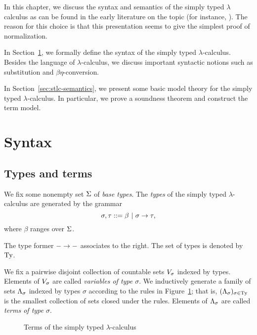 In this chapter, we discuss the syntax and semantics of the simply typed $\lambda$ calculus as can be found in the early literature on the topic (for instance, \cite{friedman1975equality, plotkin:1980}). The reason for this choice is that this presentation seems to give the simplest proof of normalization.

In Section~\ref{sec:stlc-syntax}, we formally define the syntax of the simply typed $\lambda$-calculus. Besides the language of $\lambda$-calculus, we discuss important syntactic notions such as substitution and $\beta\eta$-conversion.

In Section~\ref{sec:stlc-semantics}, we present some basic model theory for the simply typed $\lambda$-calculus. In particular, we prove a soundness theorem and construct the term model.

\section{Syntax} \label{sec:stlc-syntax}

\subsection{Types and terms}

\begin{defn}[Types] \label{def:stlc-types}
We fix some nonempty set $\Basetypes$ of \emph{base types}. The \emph{types} of the simply typed $\lambda$-calculus are generated by the grammar
\[ \sigma, \tau ::= \beta \sep \functy{\sigma}{\tau}, \]
where $\beta$ ranges over $\Basetypes$.
\end{defn}

The type former $\functy{-}{-}$ associates to the right. The set of types is denoted by $\Ty$.

\begin{defn}[Terms] \label{def:stlc-terms}
We fix a pairwise disjoint collection of countable sets $\Var[\sigma]$ indexed by types. Elements of $\Var[\sigma]$ are called \emph{variables of type $\sigma$}. We inductively generate a family of sets $\Tm[\sigma]$ indexed by types $\sigma$ according to the rules in Figure~\ref{fig:stlc-terms}; that is, $(\Tm[\sigma])_{\sigma \in \Ty}$ is the smallest collection of sets closed under the rules. Elements of $\Tm[\sigma]$ are called \emph{terms of type $\sigma$}.
\begin{figure}[h]
\caption{Terms of the simply typed $\lambda$-calculus}
\label{fig:stlc-terms}
\end{figure}
\end{defn}


